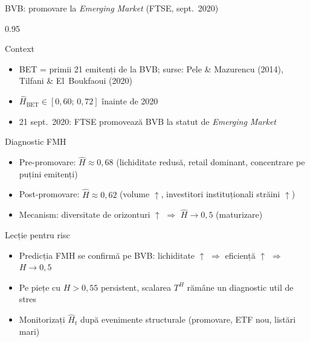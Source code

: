 \documentclass[9pt, aspectratio=169, t]{beamer}
\begin{document}
\begin{frame}[shrink=15]{BVB: promovare la \textit{Emerging Market} (FTSE, sept.\ 2020)}
\begin{cminipage}{0.95\textwidth}
\begin{block}{Context}
\begin{itemize}\setlength{\itemsep}{0pt}
    \item BET = primii 21 emitenți de la BVB; surse: Pele \& Mazurencu (2014), Tilfani \& El~Boukfaoui (2020)
    \item $\hat H_{\text{BET}}\in[0{,}60;\,0{,}72]$ înainte de 2020
    \item 21 sept.\ 2020: FTSE promovează BVB la statut de \textit{Emerging Market}
\end{itemize}
\end{block}
\begin{alertblock}{Diagnostic FMH}
\begin{itemize}\setlength{\itemsep}{0pt}
    \item Pre-promovare: $\hat H\approx 0{,}68$ (lichiditate redusă, retail dominant, concentrare pe puțini emitenți)
    \item Post-promovare: $\hat H\approx 0{,}62$ (volume $\uparrow$, investitori instituționali străini $\uparrow$)
    \item Mecanism: diversitate de orizonturi $\uparrow$ $\Rightarrow$ $\hat H\to 0{,}5$ (maturizare)
\end{itemize}
\end{alertblock}
\begin{exampleblock}{Lecție pentru risc}
\begin{itemize}\setlength{\itemsep}{0pt}
    \item Predicția FMH se confirmă pe BVB: lichiditate $\uparrow$ $\Rightarrow$ eficiență $\uparrow$ $\Rightarrow$ $H\to 0{,}5$
    \item Pe piețe cu $H>0{,}55$ persistent, scalarea $T^H$ rămâne un diagnostic util de stres
    \item Monitorizați $\hat H_t$ după evenimente structurale (promovare, ETF nou, listări mari)
\end{itemize}
\end{exampleblock}
\end{cminipage}
\end{frame}
\end{document}
